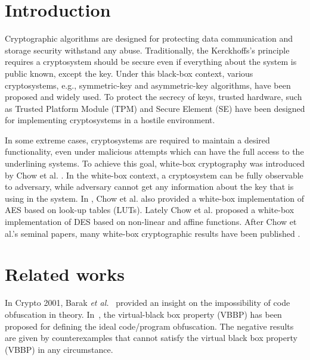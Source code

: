 \documentclass{SCIS2018}
\begin{document}

\maketitle


\section{Introduction}
Cryptographic algorithms are designed for protecting data communication and storage security withstand any abuse. Traditionally, the Kerckhoffs's principle requires a cryptosystem should be secure even if everything about the system is public known, except the key. Under this black-box context, various cryptosystems, e.g., symmetric-key and asymmetric-key algorithms, have been proposed and widely used. To protect the secrecy of keys, trusted hardware, such as Trusted Platform Module (TPM) and Secure Element (SE) have been designed for implementing cryptosystems in a hostile environment.

In some extreme cases, cryptosystems are required to maintain a desired functionality, even under malicious attempts which can have the full access to the underlining systems. To achieve this goal, white-box cryptography was introduced by Chow et al. \cite{DBLP:conf/sacrypt/ChowEJO02}. In the white-box context, a cryptosystem can be fully observable to adversary, while adversary cannot get any information about the key that is using in the system. In \cite{DBLP:conf/sacrypt/ChowEJO02}, Chow et al. also provided a white-box implementation of AES based on look-up tables (LUTs). Lately Chow et al. \cite{DBLP:conf/ccs/ChowEJO02} proposed a white-box implementation of DES based on non-linear and affine functions. After Chow et al.'s seminal papers, many white-box cryptographic results have been published \cite{DBLP:conf/sacrypt/ChowEJO02,cryptoeprint:2006:468,XiaoLai09,DBLP:conf/asiacrypt/BiryukovBK14}.

\section{Related works}
In Crypto 2001, Barak \textit{et al.}~\cite{DBLP:conf/crypto/BarakGIRSVY01,DBLP:journals/jacm/BarakGIRSVY12} provided an insight on the impossibility of code obfuscation in theory. In~\cite{DBLP:conf/crypto/BarakGIRSVY01}, the virtual-black box property (VBBP) has been proposed for defining the ideal code/program obfuscation. The negative results are given by counterexamples that cannot satisfy the virtual black box property (VBBP) in any circumstance.  
\end{document}
